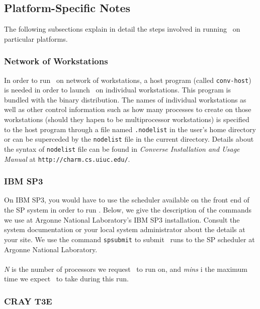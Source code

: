 \subsection{Platform-Specific Notes}

The following subsections explain in detail the steps involved in running
\NAMD\ on particular platforms.

\subsubsection{Network of Workstations}

In order to run \NAMD\ on network of workstations, a host program (called
{\tt conv-host}) is needed in order to launch \NAMD\ on individual 
workstations. This program is bundled with the binary distribution.
The names of individual workstations as well as other control information
such as how many processes to create on those workstations (should they
hapen to be multiprocessor workstations) is specified to the host program
through a file named {\tt .nodelist} in the user's home directory or can
be superceded by the {\tt nodelist} file in the current directory. Details
about the syntax of {\tt nodelist} file can be found in {\em Converse
Installation and Usage Manual} at {\tt http://charm.cs.uiuc.edu/}.

\subsubsection{IBM SP3}

On IBM SP3, you would have to use the scheduler available on the front end
of the SP system in order to run \NAMD. Below, we give the description of
the commands we use at Argonne National Laboratory's IBM SP3 installation.
Consult the system documentation or your local system administrator about the
details at your site. We use the command {\tt spsubmit} to submit \NAMD\
runs to the SP scheduler at Argonne National Laboratory.\\
\\
{\em N} is the number of processors we request \NAMD\ to run on, and
{\em mins} i the maximum time we expect \NAMD\ to take during this run.

\subsubsection{CRAY T3E}

